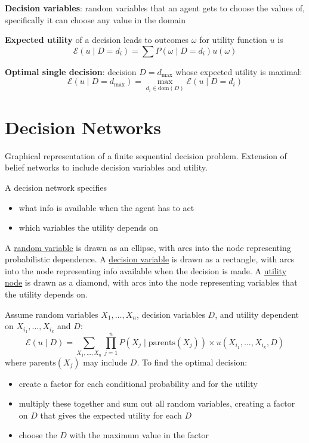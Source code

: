 \documentclass[11pt]{article}
\begin{document}
\textbf{Decision variables}: random variables that an agent gets to choose the values of, specifically
it can choose any value in the domain

\textbf{Expected utility} of a decision leads to outcomes \(\omega\) for utility function \(u\) is
$$ \mathcal{E}(u \mid D = d_{i}) = \sum P(\omega \mid D = d_{i})u(\omega) $$

\textbf{Optimal single decision}: decision \(D = d_{\max}\) whose expected utility is maximal:
$$ \mathcal{E}(u \mid D = d_{\max}) = \max_{d_{i} \in \text{dom}(D)} \mathcal{E}(u \mid D = d_{i}) $$
\section{Decision Networks}
\label{sec:org9b85840}
Graphical representation of a finite sequential decision problem.
Extension of belief networks to include decision variables and utility.

A decision network specifies
\begin{itemize}
\item what info is available when the agent has to act
\item which variables the utility depends on
\end{itemize}

A \uline{random variable} is drawn as an ellipse, with arcs into the node representing
probabilistic dependence.
A \uline{decision variable}  is drawn as a rectangle, with arcs into the node representing info
available when the decision is made.
A \uline{utility node} is drawn as a diamond, with arcs into the node representing variables that
the utility depends on.

Assume random variables \(X_{1}, \dots, X_{n}\), decision
variables \(D\), and utility dependent on \(X_{i_{1}}, \dots, X_{i_{k}}\) and \(D\):
$$ \mathcal{E}(u \mid D) = \sum_{X_{1}, \dots, X_{n}} \prod_{j=1}^{n} P(X_{j} \mid \text{parents}(X_{j})) \times u(X_{i_{1}}, \dots, X_{i_{k}}, D) $$
where \(\text{parents}(X_{j})\) may include \(D\).
To find the optimal decision:
\begin{itemize}
\item create a factor for each conditional probability and for the utility
\item multiply these together and sum out all random variables, creating a factor on \(D\)
that gives the expected utility for each \(D\)
\item choose the \(D\) with the maximum value in the factor
\end{itemize}
\end{document}
